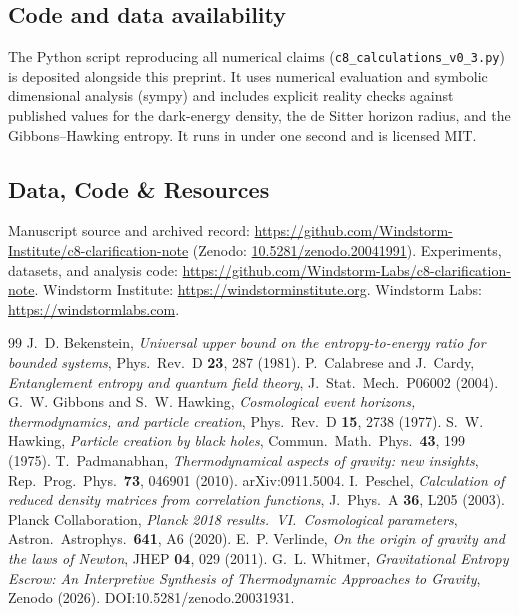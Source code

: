 \documentclass[11pt]{article}
\begin{document}
\subsection*{Code and data availability}
The Python script reproducing all numerical claims (\texttt{c8\_calculations\_v0\_3.py}) is deposited
alongside this preprint. It uses numerical evaluation and symbolic dimensional analysis (sympy) and
includes explicit reality checks against published values for the dark-energy density, the de Sitter
horizon radius, and the Gibbons--Hawking entropy. It runs in under one second and is licensed MIT.

\subsection*{Data, Code \& Resources}
\noindent Manuscript source and archived record: \url{https://github.com/Windstorm-Institute/c8-clarification-note} (Zenodo: \href{https://doi.org/10.5281/zenodo.20041991}{10.5281/zenodo.20041991}). Experiments, datasets, and analysis code: \url{https://github.com/Windstorm-Labs/c8-clarification-note}. Windstorm Institute: \url{https://windstorminstitute.org}. Windstorm Labs: \url{https://windstormlabs.com}.

\begin{thebibliography}{99}\small
{} J.~D. Bekenstein, \textit{Universal upper bound on the entropy-to-energy ratio for
bounded systems}, Phys.\ Rev.\ D \textbf{23}, 287 (1981).
 P.~Calabrese and J.~Cardy, \textit{Entanglement entropy and quantum field theory}, J.\
Stat.\ Mech.\ P06002 (2004).
 G.~W. Gibbons and S.~W. Hawking, \textit{Cosmological event horizons, thermodynamics, and
particle creation}, Phys.\ Rev.\ D \textbf{15}, 2738 (1977).
 S.~W. Hawking, \textit{Particle creation by black holes}, Commun.\ Math.\ Phys.\
\textbf{43}, 199 (1975).
\bibitem{padma} T.~Padmanabhan, \textit{Thermodynamical aspects of gravity: new insights}, Rep.\
Prog.\ Phys.\ \textbf{73}, 046901 (2010). arXiv:0911.5004.
\bibitem{peschel} I.~Peschel, \textit{Calculation of reduced density matrices from correlation
functions}, J.\ Phys.\ A \textbf{36}, L205 (2003).
\bibitem{planck} Planck Collaboration, \textit{Planck 2018 results.\ VI.\ Cosmological parameters},
Astron.\ Astrophys.\ \textbf{641}, A6 (2020).
\bibitem{verlinde} E.~P. Verlinde, \textit{On the origin of gravity and the laws of Newton}, JHEP
\textbf{04}, 029 (2011).
\bibitem{w26} G.~L. Whitmer, \textit{Gravitational Entropy Escrow: An Interpretive Synthesis of
Thermodynamic Approaches to Gravity}, Zenodo (2026). DOI:10.5281/zenodo.20031931.
\end{thebibliography}
\end{document}
